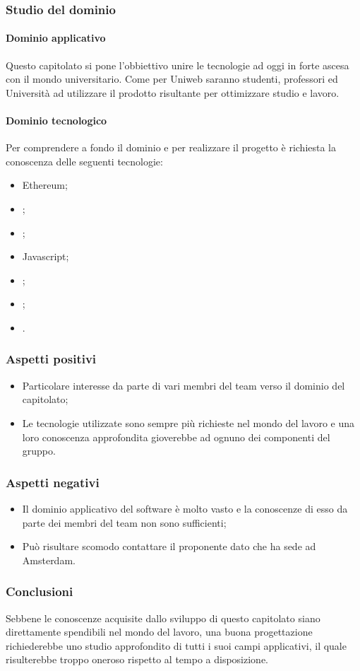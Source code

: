 		\subsubsection{Studio del dominio}
			\paragraph{Dominio applicativo} \Spazio
			Questo capitolato si pone l'obbiettivo unire le tecnologie ad oggi in forte ascesa con il mondo universitario. Come per Uniweb saranno studenti, professori ed Università ad utilizzare il prodotto risultante per ottimizzare studio e lavoro.
			\paragraph{Dominio tecnologico} \Spazio
			Per comprendere a fondo il dominio e per realizzare il progetto è richiesta la conoscenza delle seguenti tecnologie:
			\begin{itemize}
				\item Ethereum;
				\item {};
				\item {};
				\item Javascript;
				\item {};
				\item {};
				\item {}.
			\end{itemize}
		\subsubsection{Aspetti positivi}
		\begin{itemize}
			\item Particolare interesse da parte di vari membri del team verso il dominio del capitolato;
			\item Le tecnologie utilizzate sono sempre più richieste nel mondo del lavoro e una loro conoscenza approfondita gioverebbe ad ognuno dei componenti del gruppo.
		\end{itemize}
		\subsubsection{Aspetti negativi}
		\begin{itemize}
			\item Il dominio applicativo del software è molto vasto e la conoscenze di esso da parte dei membri del team non sono sufficienti;
			\item Può risultare scomodo contattare il proponente dato che ha sede ad Amsterdam.
		\end{itemize}
		\subsubsection{Conclusioni}
		Sebbene le conoscenze acquisite dallo sviluppo di questo capitolato siano direttamente spendibili nel mondo del lavoro, una buona progettazione richiederebbe uno studio approfondito di tutti i suoi campi applicativi, il quale risulterebbe troppo oneroso rispetto al tempo a disposizione.